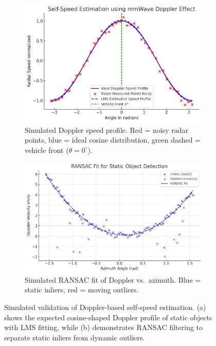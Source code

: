 \begin{figure}[!htbp]
    \centering
    \begin{subfigure}{0.48\linewidth}
        \centering
        \includegraphics[width=\linewidth]{images/Self_Speed_Doppler.png}
        \caption{Simulated Doppler speed profile.  
        Red = noisy radar points, blue = ideal cosine distribution, green dashed = vehicle front ($\theta=0^\circ$).}
        \label{fig:self_speed_doppler}
    \end{subfigure}
    \hfill
    \begin{subfigure}{0.48\linewidth}
        \centering
        \includegraphics[width=\linewidth]{images/RANSAC.png}
        \caption{Simulated RANSAC fit of Doppler vs.\ azimuth.  
        Blue = static inliers, red = moving outliers.}
        \label{fig:ransac_simulated}
    \end{subfigure}
    \caption{Simulated validation of Doppler-based self-speed estimation.  
    (a) shows the expected cosine-shaped Doppler profile of static objects with LMS fitting,  
    while (b) demonstrates RANSAC filtering to separate static inliers from dynamic outliers.}
    \label{fig:simulated_doppler_ransac}
\end{figure}


